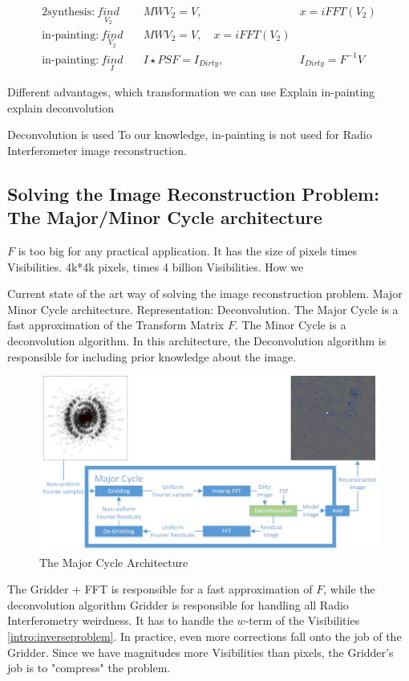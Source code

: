 \begin{alignat}{2}
\text{synthesis:}\: \underset{V_2}{find}&\quad MWV_{2} = V,  \quad &x = iFFT(V_{2}) \\
\text{in-painting:}\: \underset{V_2}{find}&\quad MWV_{2} = V,  \quad x = iFFT(V_{2})\\
\text{in-painting:}\: \underset{I}{find}&\quad I \star PSF = I_{Dirty},  \quad &I_{Dirty} = F^{-1}V
\end{alignat}


Different advantages, which transformation we can use
Explain in-painting
explain deconvolution

Deconvolution is used
To our knowledge, in-painting is not used for Radio Interferometer image reconstruction.





\subsection{Solving the Image Reconstruction Problem: The Major/Minor Cycle architecture}
$F$ is too big for any practical application. It has the size of pixels times Visibilities. 4k*4k pixels, times 4 billion Visibilities. How we 

Current state of the art way of solving the image reconstruction problem. Major Minor Cycle architecture.
Representation: Deconvolution.
The Major Cycle is a fast approximation of the Transform Matrix $F$.
The Minor Cycle is a deconvolution algorithm. In this architecture, the Deconvolution algorithm is responsible for including prior knowledge about the image.

\begin{figure}[h]
	\centering
	\includegraphics[width=0.80\linewidth]{./chapters/02.hypo/Major-Minor3.png}
	\caption{The Major Cycle Architecture}
	\label{intro:major}
\end{figure}

The Gridder + FFT is responsible for a fast approximation of $F$, while the deconvolution algorithm
Gridder is responsible for handling all Radio Interferometry weirdness. It has to handle the $w$-term of the Visibilities \eqref{intro:inverseproblem}. In practice, even more corrections fall onto the job of the Gridder. Since we have magnitudes more Visibilities than pixels, the Gridder's job is to "compress" the problem.

